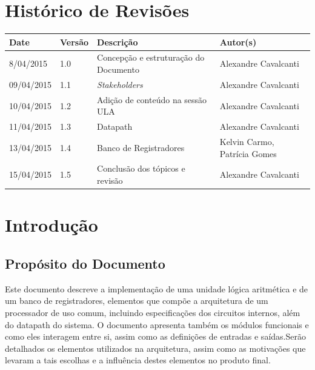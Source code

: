 \documentclass{report}
\begin{document}

\capa
\newpage
\newpage

\chapter*{Histórico de Revisões}
  \vspace*{1cm}
  \begin{table}[ht]
    \centering
    \begin{tabular}[pos]{|m{2cm} |m{2cm}| m{6cm} | m{3cm}|} 
      \hline
      \cellcolor[gray]{0.9}
      \textbf{Date} & \cellcolor[gray]{0.9} \textbf{Versão}  &\cellcolor[gray]{0.9}\textbf{Descrição} & \cellcolor[gray]{0.9}\textbf{Autor(s)}\\
      \hline
      8/04/2015 & 1.0 & Concepção e estruturação do Documento & Alexandre Cavalcanti \\ \hline      
      09/04/2015 & 1.1 & \textit{Stakeholders} & Alexandre Cavalcanti \\ \hline
      10/04/2015 & 1.2 & Adição de conteúdo na sessão ULA & Alexandre Cavalcanti \\ \hline      
      11/04/2015 & 1.3 & Datapath & Alexandre Cavalcanti \\ \hline      
      13/04/2015 & 1.4 & Banco de Registradores & Kelvin Carmo, Patrícia Gomes \\ \hline
      15/04/2015 & 1.5 & Conclusão dos tópicos e revisão & Alexandre Cavalcanti \\ \hline      
    \end{tabular}
  \end{table}

\tableofcontents

\chapter{Introdução}
  
  \section{Propósito do Documento}
  Este documento descreve a implementação de uma unidade lógica aritmética e de um banco de registradores, elementos que compõe a arquitetura de um processador de uso comum, incluindo especificações dos circuitos internos, além do datapath do sistema. O documento apresenta também os módulos funcionais e como eles interagem entre si, assim como as definições de entradas e saídas.Serão detalhados os elementos utilizados na arquitetura, assim como as motivações que levaram a tais escolhas e a influência destes elementos no produto final.
  
\end{document}
